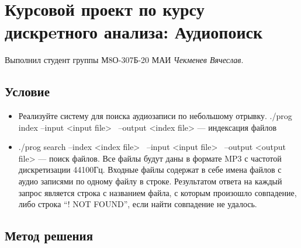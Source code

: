 \documentclass[12pt]{article}
\begin{document}
    \section*{Курсовой проект по курсу дискрeтного анализа: 
    Аудиопоиск}

    Выполнил студент группы М8О-307Б-20 МАИ \textit{Чекменев Вячеслав}.
    \subsection*{Условие}
    \begin{itemize}
    \item Реализуйте систему для поиска аудиозаписи по небольшому отрывку.
./prog index --input <input file> \
--output <index file> --- индексация файлов
    \item ./prog search --index <index file> \
--input <input file> \
--output <output file> --- поиск файлов. Все файлы будут даны в формате MP3 с частотой дискретизации 44100Гц.
Входные файлы содержат в себе имена файлов с аудио записями по одному файлу в строке.
Результатом ответа на каждый запрос является строка с названием файла, с которым произошло
совпадение, либо строка “! NOT FOUND”, если найти совпадение не удалось.
    
    \end{itemize}
    \subsection*{Метод решения}
\end{document}
